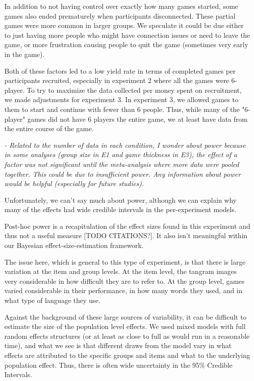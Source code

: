 \documentclass{stanfordletter}
\newcommand{\theysaid}[1]{\begin{leftbar} \noindent 
		\textsl{ #1}\end{leftbar}}
\begin{document}
\begin{letter}{}
{          	In addition to not having control over exactly how many games started, some games also ended prematurely when participants disconnected. These partial games were more common in larger groups. We speculate it could be due either to just having more people who might have connection issues or need to leave the game, or more frustration causing people to quit the game (sometimes very early in the game). 
          	
          	Both of these factors led to a low yield rate in terms of completed games per participants recruited, especially in experiment 2 where all the games were 6-player. To try to maximize the data collected per money spent on recruitment, we made adjustments for experiment 3. 
          	In experiment 3, we allowed games to them to start and continue with fewer than 6 people. Thus, while many of the "6-player" games did not have 6 players the entire game, we at least have data from the entire course of the game. }
          
          
          \theysaid{- Related to the number of data in each condition, I wonder about power because in some analyses (group size in E1 and game thickness in E3), the effect of a factor was not significant until the meta-analysis where more data were pooled together. This could be due to insufficient power. Any information about power would be helpful (especially for future studies).}
          
          Unfortunately, we can't say much about power, although we can explain why many of the effects had wide credible intervals in the per-experiment models. 
          
          Post-hoc power is a recapitulation of the effect sizes found in this experiment and thus not a useful measure [TODO CITATIONS?]. It also isn't meaningful within our Bayesian effect-size-estimation framework. 
          
          The issue here, which is general to this type of experiment, is that there is large variation at the item and group levels. At the item level, the tangram images very considerable in how difficult they are to refer to. At the group level, games varied considerable in their performance, in how many words they used, and in what type of language they use. 
          
          Against the background of these large sources of variability, it can be difficult to estimate the size of the population level effects. We used mixed models with full random effects structures (or at least as close to full as would run in a reasonable time), and what we see is that different draws from the model vary in what effects are attributed to the specific groups and items and what to the underlying population effect. Thus, there is often wide uncertainty in the 95\% Credible Intervals. 
          

\end{letter}
\end{document}
